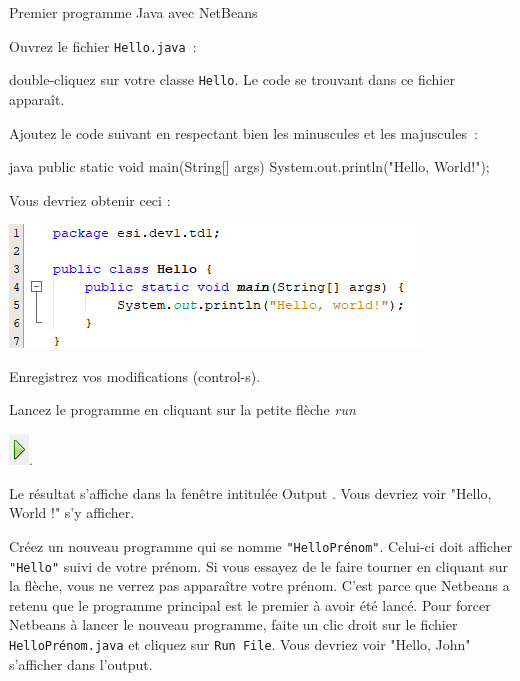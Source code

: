 \documentclass[a4paper,11pt]{style-esi/td}
\begin{document}
\begin{Tutoriel}{Premier programme Java avec NetBeans}
\begin{steps}
		\item Ouvrez le fichier \texttt{Hello.java}~:

		double-cliquez sur votre classe \texttt{Hello}.
		Le code se trouvant dans ce fichier apparaît.


		Ajoutez le code suivant en respectant bien les
		minuscules et les majuscules~:

		\begin{Code}{java}
			public static void main(String[] args) {
					System.out.println("Hello, World!");
				}
		\end{Code}

		Vous devriez obtenir ceci :

		\begin{center}
			\includegraphics{images/nb_newproject_code}
		\end{center}
		Enregistrez vos modifications (control-s).

		\item Lancez le programme en cliquant sur la petite flèche \emph{run}

		\includegraphics{images/nb_newproject_run}.

		Le résultat s'affiche dans la fenêtre intitulée \og Output \fg.
		Vous devriez voir "Hello, World !" s'y afficher.

		\item Créez un nouveau programme qui se nomme \texttt{"HelloPrénom"}. Celui-ci doit afficher \texttt{"Hello"} suivi de votre prénom.
		Si vous essayez de le faire tourner en cliquant sur la flèche, vous ne verrez pas apparaître votre prénom. C'est parce que Netbeans a retenu que le programme principal est le premier à avoir été lancé. Pour forcer Netbeans à lancer le nouveau programme, faite un clic droit sur le fichier \texttt{HelloPrénom.java} et cliquez sur \texttt{Run File}. Vous devriez voir "Hello, John" s'afficher dans l'output.


\end{steps}
\end{Tutoriel}
\end{document}
